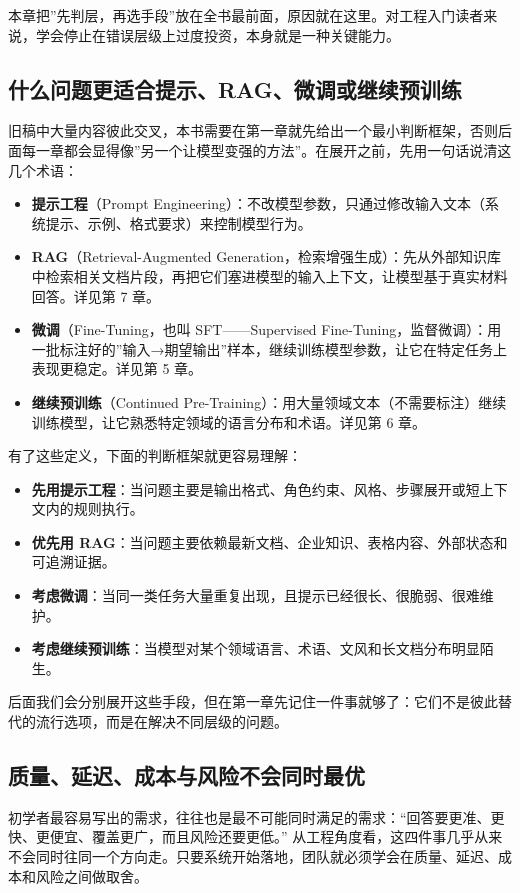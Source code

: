 本章把”先判层，再选手段”放在全书最前面，原因就在这里。对工程入门读者来说，学会停止在错误层级上过度投资，本身就是一种关键能力。

\subsection{什么问题更适合提示、RAG、微调或继续预训练}
旧稿中大量内容彼此交叉，本书需要在第一章就先给出一个最小判断框架，否则后面每一章都会显得像”另一个让模型变强的方法”。在展开之前，先用一句话说清这几个术语：

\begin{itemize}
  \item \textbf{提示工程}（Prompt Engineering）：不改模型参数，只通过修改输入文本（系统提示、示例、格式要求）来控制模型行为。
  \item \textbf{RAG}（Retrieval-Augmented Generation，检索增强生成）：先从外部知识库中检索相关文档片段，再把它们塞进模型的输入上下文，让模型基于真实材料回答。详见第 7 章。
  \item \textbf{微调}（Fine-Tuning，也叫 SFT——Supervised Fine-Tuning，监督微调）：用一批标注好的”输入→期望输出”样本，继续训练模型参数，让它在特定任务上表现更稳定。详见第 5 章。
  \item \textbf{继续预训练}（Continued Pre-Training）：用大量领域文本（不需要标注）继续训练模型，让它熟悉特定领域的语言分布和术语。详见第 6 章。
\end{itemize}

有了这些定义，下面的判断框架就更容易理解：
\begin{itemize}
  \item \textbf{先用提示工程}：当问题主要是输出格式、角色约束、风格、步骤展开或短上下文内的规则执行。
  \item \textbf{优先用 RAG}：当问题主要依赖最新文档、企业知识、表格内容、外部状态和可追溯证据。
  \item \textbf{考虑微调}：当同一类任务大量重复出现，且提示已经很长、很脆弱、很难维护。
  \item \textbf{考虑继续预训练}：当模型对某个领域语言、术语、文风和长文档分布明显陌生。
\end{itemize}

后面我们会分别展开这些手段，但在第一章先记住一件事就够了：它们不是彼此替代的流行选项，而是在解决不同层级的问题。

\subsection{质量、延迟、成本与风险不会同时最优}
初学者最容易写出的需求，往往也是最不可能同时满足的需求：“回答要更准、更快、更便宜、覆盖更广，而且风险还要更低。” 从工程角度看，这四件事几乎从来不会同时往同一个方向走。只要系统开始落地，团队就必须学会在质量、延迟、成本和风险之间做取舍。


